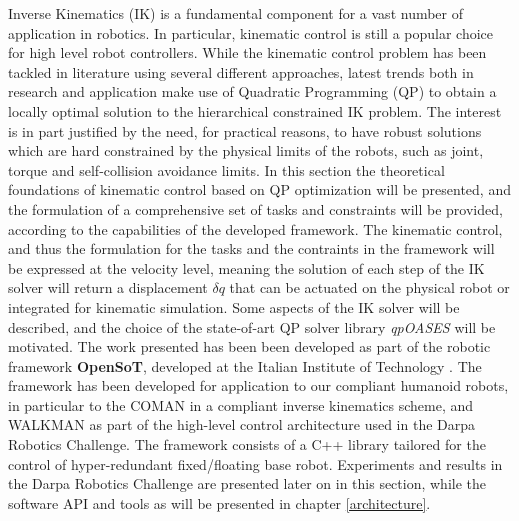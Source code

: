 Inverse Kinematics (IK) is a fundamental component for a vast number of application in robotics. In particular, kinematic control is still a popular choice for high level robot controllers. While the kinematic control problem has been tackled in literature using several different approaches, latest trends both in research and application make use of Quadratic Programming (QP) to obtain a locally optimal solution to the hierarchical constrained IK problem. The interest is in part justified by the need, for practical reasons, to have robust solutions which are hard constrained by the physical limits of the robots, such as joint, torque and self-collision avoidance limits. In this section the theoretical foundations of kinematic control based on QP optimization will be presented, and the formulation of a comprehensive set of tasks and constraints will be provided, according to the capabilities of the developed framework. The kinematic control, and thus the formulation for the tasks and the contraints in the framework will be expressed at the velocity level, meaning the solution of each step of the IK solver will return a displacement $\delta q$ that can be actuated on the physical robot or integrated for kinematic simulation. Some aspects of the IK solver will be described, and the choice of the state-of-art QP solver library \emph{qpOASES} will be motivated. 
The work presented has been been developed as part of the robotic framework \textbf{OpenSoT}, developed at the Italian Institute of Technology \cite{Rocchi2015-is, Fang2015-cr, Ajoudani2014-fs, Lee2014-dg}. The framework has been developed for application to our compliant humanoid robots, in particular to the COMAN in a compliant inverse kinematics scheme, and WALKMAN as part of the high-level control architecture  used in the Darpa Robotics Challenge. The framework consists of a C++ library tailored for the control of hyper-redundant fixed/floating base robot. Experiments and results in the Darpa Robotics Challenge are presented later on in this section, while the software API and tools as will be presented in chapter \ref{architecture}.

